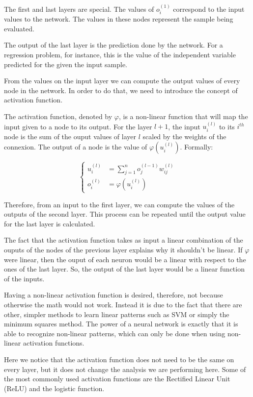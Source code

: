 The first and last layers are special.
The values of $o^{(1)}_i$ correspond to the input values to the network.
The values in these nodes represent the sample being evaluated.

The output of the last layer is the prediction done by the network.
For a regression problem, for instance, this is the value of the independent variable predicted for the given the input sample.

From the values on the input layer we can compute the output values of every node in the network.
In order to do that, we need to introduce the concept of activation function.

The activation function, denoted by $\varphi$, is a non-linear function that will map the input given to a node to its output.
For the layer $l+1$, the input $u^{(l)}_i$ to its $i^{th}$ node is the sum of the ouput values of layer $l$ scaled by the weights of the connexion.
The output of a node is the value of $\varphi\left(u^{(l)}_i\right)$.
Formally:

\begin{equation}
    \begin{cases}
        u^{(l)}_i &= \sum_{j=1}^{n}o^{(l-1)}_j w^{(l)}_{ij} \\
        o^{(l)}_i &= \varphi\left(u^{(l)}_i\right)
    \end{cases}
\end{equation}

Therefore, from an input to the first layer, we can compute the values of the outputs of the second layer.
This process can be repeated until the output value for the last layer is calculated.

The fact that the activation function takes as input a linear combination of the ouputs of the nodes of the previous layer explains why it shouldn't be linear.
If $\varphi$ were linear, then the ouput of each neuron would be a linear with respect to the ones of the last layer.
So, the output of the last layer would be a linear function of the inputs.

Having a non-linear activation function is desired, therefore, not because otherwise the math would not work.
Instead it is due to the fact that there are other, simpler methods to learn linear patterns such as SVM or simply the minimum squares method.
The power of a neural network is exactly that it is able to recognize non-linear patterns, which can only be done when using non-linear activation functions.

Here we notice that the activation function does not need to be the same on every layer, but it does not change the analysis we are performing here.
Some of the most commonly used activation functions are the Rectified Linear Unit (ReLU) and the logistic function.

